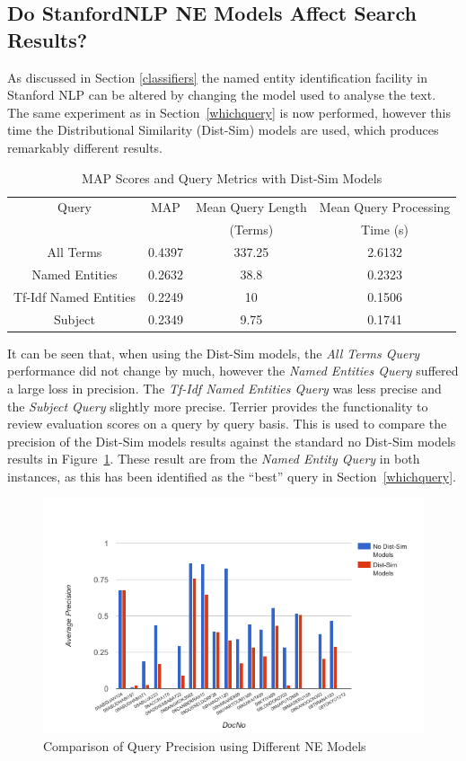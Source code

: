 \documentclass{l4proj}
\begin{document}
\subsection{Do StanfordNLP NE Models Affect Search Results?} \label{distsim}
As discussed in Section \ref{classifiers} the named entity identification facility in Stanford NLP can be altered by changing the model used to analyse the text. The same experiment as in Section~\ref{whichquery} is now performed, however this time the Distributional Similarity (Dist-Sim) models are used, which produces remarkably different results.
\begin{table}
\centering
\begin{tabular}{|c|c|c|c|}
\hline
Query                 & MAP    & Mean Query Length & Mean Query Processing \\ 
& & (Terms) & Time (s) \\\hline
All Terms             & 0.4397 & 337.25             & 2.6132                      \\ \hline
Named Entities        & 0.2632 & 38.8             & 0.2323                         \\ \hline
Tf-Idf Named Entities & 0.2249 & 10                & 0.1506                       \\ \hline
Subject               & 0.2349 & 9.75              & 0.1741                        \\ \hline
\end{tabular}
\caption{MAP Scores and Query Metrics with Dist-Sim Models}
\label{results}
\end{table}
It can be seen that, when using the Dist-Sim models, the \textit{All Terms Query} performance did not change by much, however the \textit{Named Entities Query} suffered a large loss in precision. The \textit{Tf-Idf Named Entities Query} was less precise and the \textit{Subject Query} slightly more precise.
Terrier provides the functionality to review evaluation scores on a query by query basis. This is used to compare the precision of the Dist-Sim models results against the standard no Dist-Sim models results in Figure~\ref{query_by_query}. These result are from the \textit{Named Entity Query} in both instances, as this has been identified as the ``best'' query in Section~\ref{whichquery}.
\begin{figure}[H]
\centering
\includegraphics[scale=0.90]{images/query_by_query}
\caption{Comparison of Query Precision using Different NE Models}
\label{query_by_query}
\end{figure}
\end{document}

